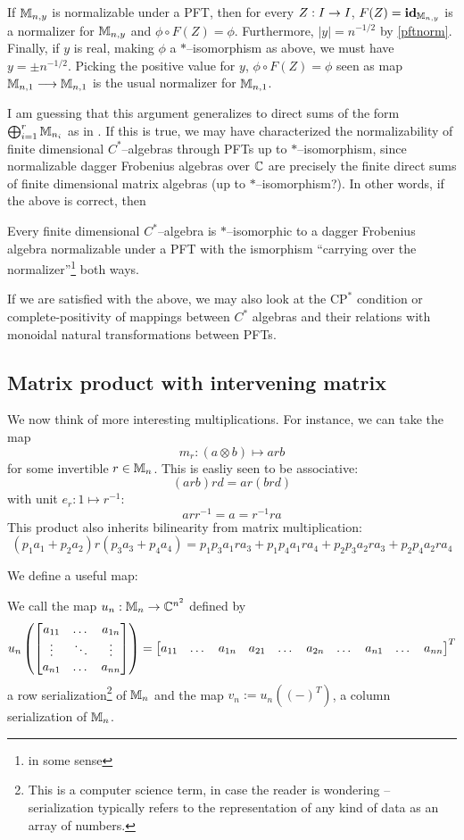 If $\mathbb{M}_{n, y}$ is normalizable under a PFT, then for every $Z : I \rightarrow I$,
$F(Z) = \textbf{id}_{\mathbb{M}_{n, y}}$ is a normalizer for $\mathbb{M}_{n, y}$ and
$\phi \circ F(Z) = \phi$. Furthermore, $|y| = n^{-1/2}$ by \ref{pftnorm}.
Finally, if $y$ is real, making $\phi$ a $*$--isomorphism as above, we must have
$y = \pm n^{-1/2}$. Picking the positive value for $y$,
$\phi \circ F(Z) = \phi$ seen as map $\mathbb{M}_{n, 1} \longrightarrow \mathbb{M}_{n, 1}$ is the usual
normalizer for $\mathbb{M}_{n, 1}$.

I am guessing that this argument generalizes to direct sums of the form
$\bigoplus_{i = 1}^r \mathbb{M}_{n_i}$ as in \cite[10]{CatQChan}.  If this is true, we
may have characterized the normalizability of finite dimensional $C^*$--algebras
through PFTs up to $*$--isomorphism, since normalizable dagger Frobenius
algebras over $\mathbb{C}$ are precisely the finite direct sums of finite dimensional
matrix algebras (up to $*$--isomorphism?). In other words, if the above is
correct, then
\begin{thm}
Every finite dimensional $C^*$--algebra is $*$--isomorphic to a dagger Frobenius
algebra normalizable under a PFT with the ismorphism ``carrying over the
normalizer''\footnote{in some sense} both ways.
\end{thm}

If we are satisfied with the above, we may also look at the $\text{CP}^*$
condition or complete-positivity of mappings between $C^*$ algebras and their
relations with monoidal natural transformations between PFTs.

\subsection{Matrix product with intervening matrix}

We now think of more interesting multiplications. For instance, we can take the
map
\[
  m_r : (a \otimes b) \mapsto arb
\]
for some invertible $r \in \mathbb{M}_n$. This is easliy seen to be associative:
\[
  (arb)rd = ar(brd)
\]
with unit $e_r : 1 \mapsto r^{-1}$:
\[
  arr^{-1} = a = r^{-1}ra
\]
This product also inherits bilinearity from matrix multiplication:
\[
  (p_1a_1 + p_2a_2)r(p_3a_3 + p_4a_4)
    = p_1p_3a_1ra_3 + p_1p_4a_1ra_4 + p_2p_3a_2ra_3 + p_2p_4a_2ra_4
\]

We define a useful map:
\begin{defn}
We call the map $u_n : \mathbb{M}_n \rightarrow \mathbb{C}^{n^2}$ defined by
\[
  u_n\left( \begin{bmatrix} a_{11} & \dots & a_{1n} \\
             \vdots & \ddots & \vdots\\
             a_{n1} & \dots & a_{nn} \end{bmatrix} \right)
    = \begin{bmatrix} a_{11} & \dots & a_{1n} & a_{21} & \dots & a_{2n} &
            \dots & a_{n1} & \dots & a_{nn} \end{bmatrix}^{T}
\]
a row serialization\footnote{This is a computer science term, in case the reader
is wondering -- serialization typically refers to the representation of any kind
of data as an array of numbers.} of $\mathbb{M}_n$ and the map $v_n := u_n((-)^T)$, a
column serialization of $\mathbb{M}_n$.
\end{defn}

